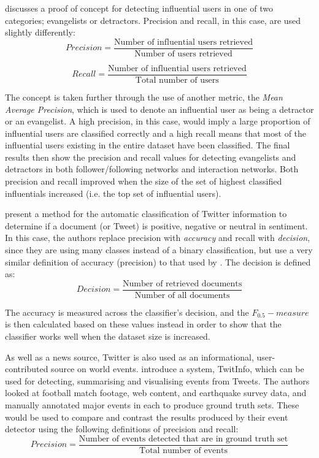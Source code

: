 \cite{bigonha10} discusses a proof of concept for detecting influential users in one of two categories; evangelists or detractors. Precision and recall, in this case, are used slightly differently:
\[	
	Precision = \frac{\text{Number of influential users retrieved}}{\text{Number of users retrieved}}
\]

\[
	Recall = \frac{\text{Number of influential users retrieved}}{\text{Total number of users}}
\]

The concept is taken further through the use of another metric, the \emph{Mean Average Precision}, which is used to denote an influential user as being a detractor or an evangelist. A high precision, in this case, would imply a large proportion of influential users are classified correctly and a high recall means that most of the influential users existing in the entire dataset have been classified. The final results then show the precision and recall values for detecting evangelists and detractors in both follower/following networks and interaction networks. Both precision and recall improved when the size of the set of highest classified influentials increased (i.e. the top set of influential users).

\citet{pak10} present a method for the automatic classification of Twitter information to determine if a document (or Tweet) is positive, negative or neutral in sentiment. In this case, the authors replace precision with \emph{accuracy} and recall with \emph{decision}, since they are using many classes instead of a binary classification, but use a very similar definition of accuracy (precision) to that used by \citet{castillo11}. The decision is defined as:
%
\[
	Decision = \frac{\text{Number of retrieved documents}}{\text{Number of all documents}}
\]

The accuracy is measured across the classifier's decision, and the $ F_{0.5}-measure $  is then calculated based on these values instead in order to show that the classifier works well when the dataset size is increased.

As well as a news source, Twitter is also used as an informational, user-contributed source on world events. \citet{marcus11} introduce a system, TwitInfo, which can be used for detecting, summarising and visualising events from Tweets. The authors looked at football match footage, web content, and earthquake survey data, and manually annotated major events in each to produce ground truth sets. These would be used to compare and contrast the results produced by their event detector using the following definitions of precision and recall:
\[	
	Precision = \frac{\text{Number of events detected that are in ground truth set}}{\text{Total number of events}}
\]

